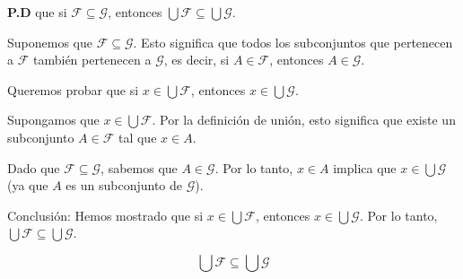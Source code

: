 \begin{solution}
    \textbf{P.D} que si \( \mathscr{F} \subseteq \mathscr{G} \), entonces \( \bigcup \mathscr{F} \subseteq \bigcup \mathscr{G} \).

    Suponemos que \( \mathscr{F} \subseteq \mathscr{G} \). Esto significa que todos los subconjuntos que pertenecen a \( \mathscr{F} \) también pertenecen a \( \mathscr{G} \), es decir, si \( A \in \mathscr{F} \), entonces \( A \in \mathscr{G} \).
    
    Queremos probar que si \( x \in \bigcup \mathscr{F} \), entonces \( x \in \bigcup \mathscr{G} \).
    
    Supongamos que \( x \in \bigcup \mathscr{F} \).
    Por la definición de unión, esto significa que existe un subconjunto \( A \in \mathscr{F} \) tal que \( x \in A \).
    
    Dado que \( \mathscr{F} \subseteq \mathscr{G} \), sabemos que \( A \in \mathscr{G} \). Por lo tanto, \( x \in A \) implica que \( x \in \bigcup \mathscr{G} \) (ya que \( A \) es un subconjunto de \( \mathscr{G} \)).
    
    Conclusión:
    Hemos mostrado que si \( x \in \bigcup \mathscr{F} \), entonces \( x \in \bigcup \mathscr{G} \). Por lo tanto, \( \bigcup \mathscr{F} \subseteq \bigcup \mathscr{G} \).
    
    \[
    \boxed{\bigcup \mathscr{F} \subseteq \bigcup \mathscr{G}}
    \]
\end{solution}